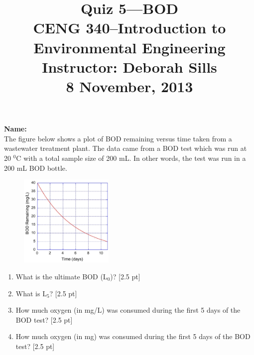 \documentclass[12pt,letterpaper]{article}
\begin{document}
\setlength{\parindent}{0cm} 


\frenchspacing


\title {\Large{\textbf{Quiz 5---BOD}}\\ \large{CENG 340--Introduction to Environmental Engineering\\
Instructor: Deborah Sills\\ \textbf{8 November, 2013}}}
\author {}
\date {}
\maketitle

\vspace{-0.4 in}
\textbf{\large{Name:}}\\



The figure below shows a plot of BOD remaining versus time taken from a wastewater treatment plant.  The data came from a BOD test which was run at 20 $^0$C with a total sample size of 200 mL.  In other words, the test was run in a 200 mL BOD bottle.

\vspace{0.1in}

\begin{figure}
\centering
\includegraphics[width=0.4\textwidth]{quiz_bod_take2}
\end{figure}

\vspace{-0.1in}

\begin{enumerate}
\item  What is the ultimate BOD (L$_0$)?
\vspace{0.5in} [2.5 pt]

\item What is L$_5$?
\vspace{0.5in} [2.5 pt]

\item How much oxygen (in mg/L) was consumed during the first 5 days of the BOD test?
\vspace{0.5in} [2.5 pt]
\item How much oxygen (in mg) was consumed during the first 5 days of the BOD test? [2.5 pt]

\end{enumerate}
\end{document}
